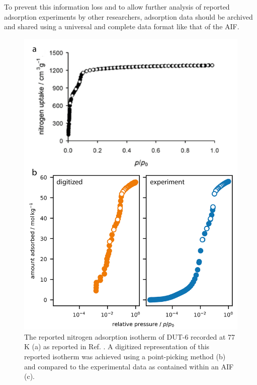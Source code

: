 \documentclass[journal=langd5,manuscript=article]{achemso}
\begin{document}
To prevent this information loss and to allow further analysis of reported adsorption experiments by other researchers, adsorption data should be archived and shared using a universal and complete data format like that of the AIF.

  
  \begin{figure}[htb]
    \includegraphics{./figures/example-01.png}
      \caption{The reported nitrogen adsorption isotherm of DUT-6 recorded at 77$\,$K (a) as reported in Ref. . A digitized representation of this reported isotherm was achieved using a point-picking method (b) and compared to the experimental data as contained within an AIF (c).}
      \label{fgr:example}
    \end{figure}
\end{document}
